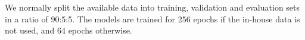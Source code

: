 \documentclass[11pt,a4paper]{article}
\begin{document}
We normally split the available data into training, validation and evaluation sets in a ratio of 90:5:5. The models are trained for 256 epochs if the in-house data is not used, and 64 epochs otherwise.




%






	
\end{document}
